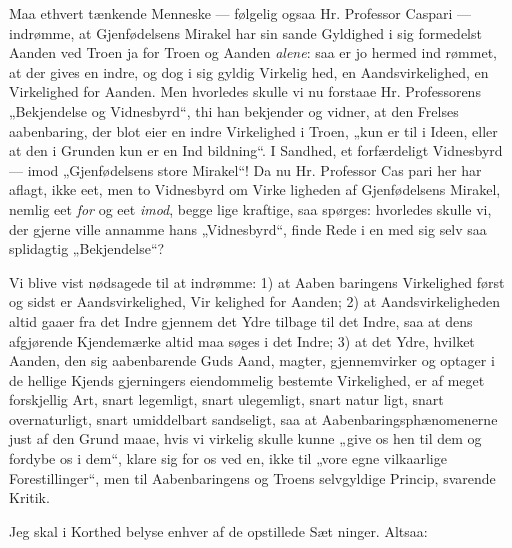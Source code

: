 \documentclass[12pt]{book}
\newcommand{\opage}[1]{\marginnote{\footnotesize\textit{[#1]}}}
\begin{document}
Maa ethvert tænkende Menneske --- følgelig ogsaa Hr.
Professor Caspari --- indrømme, at Gjenfødelsens Mirakel
har sin sande Gyldighed i sig formedelst Aanden ved Troen
ja for Troen og Aanden \emph{alene}: saa er jo hermed ind\-%
rømmet, at der gives en indre, og dog i sig gyldig Virkelig\-%
hed, en Aandsvirkelighed, en Virkelighed for Aanden. Men
hvorledes skulle vi nu forstaae Hr. Professorens „Bekjendelse
og Vidnesbyrd“, thi han bekjender og vidner, at den Frelses\-%
aabenbaring, der blot eier en indre Virkelighed i Troen,
„kun er til i Ideen, eller at den i Grunden kun er en Ind\-%
bildning“. I Sandhed, et forfærdeligt Vidnesbyrd --- imod
„Gjenfødelsens store Mirakel“! Da nu Hr. Professor Cas\-%
pari her har aflagt, ikke eet, men to Vidnesbyrd om Virke\-%
ligheden af Gjenfødelsens Mirakel, nemlig eet \emph{for} og eet
\emph{imod}, begge lige kraftige, saa spørges: hvorledes skulle vi,
der gjerne ville annamme hans „Vidnesbyrd“, finde Rede i
en med sig selv saa splidagtig „Bekjendelse“?

Vi blive vist nødsagede til at indrømme: 1) at Aaben\-%
baringens Virkelighed først og sidst er Aandsvirkelighed, Vir\-%
kelighed for Aanden; 2) at Aandsvirkeligheden altid gaaer
fra det Indre gjennem det Ydre tilbage til det Indre, saa at
dens afgjørende Kjendemærke altid maa søges i det Indre;
3) at det Ydre, hvilket Aanden, den sig aabenbarende Guds
Aand, magter, gjennemvirker og optager i de hellige Kjends\-%
gjerningers eiendommelig bestemte Virkelighed, er af meget
forskjellig Art, snart legemligt, snart ulegemligt, snart natur\-%
ligt, snart overnaturligt, snart umiddelbart sandseligt, saa at
Aabenbaringsphænomenerne just af den Grund maae, hvis
vi virkelig skulle kunne „give os hen til dem og fordybe os i
dem“, klare sig for os ved en, ikke til „vore egne vilkaarlige
\opage{303}\setcounter{footnote}{0}%
Forestillinger“, men til Aabenbaringens og Troens selvgyldige
Princip, svarende Kritik.

Jeg skal i Korthed belyse enhver af de opstillede Sæt\-%
ninger. Altsaa:
\end{document}

